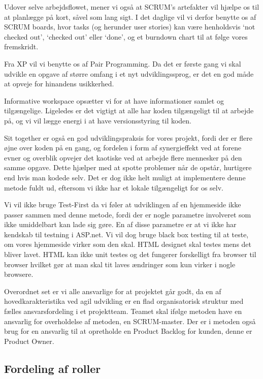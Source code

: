 \documentclass[12pt, a4paper]{report}
\begin{document}
Udover selve arbejdsflowet, mener vi også at SCRUM’s artefakter vil hjælpe os til at planlægge på kort, såvel som lang sigt. I det daglige vil vi derfor benytte os af SCRUM boards, hvor tasks (og herunder user stories) kan være henholdsvis ‘not checked out’, ‘checked out’ eller ‘done’, og et burndown chart til at følge vores fremskridt.

Fra XP vil vi benytte os af Pair Programming. Da det er første gang vi skal udvikle en opgave af større omfang i et nyt udviklingssprog, er det en god måde at opveje for hinandens usikkerhed.

Informative workspace opsætter vi for at have informationer samlet og tilgængelige. Ligeledes er det vigtigt at alle har koden tilgængeligt til at arbejde på, og vi vil lægge energi i at have versionsstyring til koden.

Sit together er også en god udviklingspraksis for vores projekt, fordi der er flere øjne over koden på en gang, og fordelen i form af synergieffekt ved at forene evner og overblik opvejer det kaotiske ved at arbejde flere mennesker på den samme opgave. Dette hjælper med at spotte problemer når de opstår, hurtigere end hvis man kodede selv. Det er dog ikke helt muligt at implementere denne metode fuldt ud, eftersom vi ikke har et lokale tilgængeligt for os selv.

Vi vil ikke bruge Test-First da vi føler at udviklingen af en hjemmeside ikke passer sammen med denne metode, fordi der er nogle parametre involveret som ikke umiddelbart kan lade sig gøre. En af disse parametre er at vi ikke har kendskab til testning i ASP.net.
Vi vil dog bruge black box testing til at teste, om vores hjemmeside virker som den skal.
HTML designet skal testes mens det bliver lavet. HTML kan ikke unit testes og det fungerer forskelligt fra browser til browser hvilket gør at man skal tit laves ændringer som kun virker i nogle browsere.


Overordnet set er vi alle ansvarlige for at projektet går godt, da en af hovedkarakteristika ved agil udvikling er en flad organisatorisk struktur med fælles ansvarsfordeling i et projektteam. Teamet skal ifølge metoden have en ansvarlig for overholdelse af metoden, en SCRUM-master. Der er i metoden også brug for en ansvarlig til at opretholde en Product Backlog for kunden, denne er Product Owner.

\subsection{Fordeling af roller}
\end{document}
